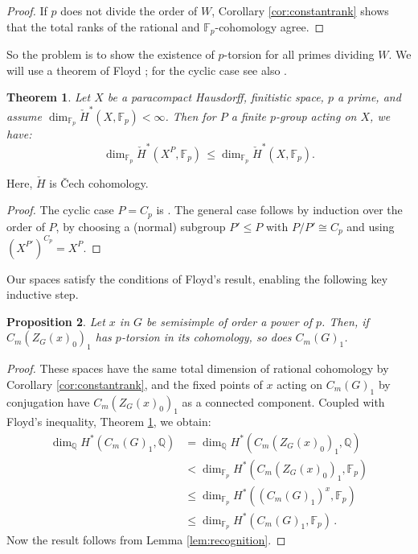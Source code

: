 \documentclass[oneside, 12pt, a4paper]{amsart}
\numberwithin{equation}{section}
\newcommand{\F}{\mathbb{F}}
\theoremstyle{plain}
\newtheorem{theorem}{Theorem}[section]
\newtheorem{proposition}[theorem]{Proposition}
\theoremstyle{definition}
\theoremstyle{remark}
\begin{document}
\begin{proof}
If $p$ does not divide the order of $W$, Corollary \ref{cor:constantrank} shows that the total ranks of the rational and $\mathbb{F}_p$-cohomology agree.
\end{proof}

So the problem is to show the existence of $p$-torsion for all primes dividing $W$. We will use a theorem of Floyd \cite[Theorem 4.4]{Floyd}; for the cyclic case see also \cite[Theorem 3.10.4]{AlldayPuppe}.
\begin{theorem}\label{thm:floyd}
Let $X$ be a paracompact Hausdorff, finitistic space, $p$ a prime, and assume $\dim_{\F_p}\check{H}^\ast(X,\F_p) < \infty$. Then for $P$ a finite $p$-group acting on $X$, we have:
\[
\dim_{\F_p} \check{H}^\ast(X^P,\F_p)\, \leq \dim_{\F_p} \check{H}^\ast(X,\F_p). 
\]
\end{theorem}

Here, $\check{H}$ is \v{C}ech cohomology.

\begin{proof}
The cyclic case $P=C_p$ is \cite[Theorem 3.10.4]{AlldayPuppe}. The general case follows by induction over the order of $P$, by choosing a (normal) subgroup $P'\leq P$ with $P/P'\cong C_p$ and using $(X^{P'})^{C_p}= X^P$.
\end{proof}

Our spaces satisfy the conditions of Floyd's result, enabling the following key inductive step.

\begin{proposition} \label{prop:smith}
Let $x$ in $G$ be semisimple of order a power of $p$. Then, if $C_m(Z_G(x)_0)_1$ has $p$-torsion in its cohomology, so does $C_m(G)_1$.
\end{proposition}
\begin{proof}
These spaces have the same total dimension of rational cohomology by Corollary \ref{cor:constantrank}, and the fixed points of $x$ acting on $C_m(G)_1$ by conjugation have $C_m(Z_G(x)_0)_1$ as a connected component. Coupled with Floyd's inequality, Theorem \ref{thm:floyd}, we obtain:
\begin{equation*}
\begin{split}
\dim_{\mathbb{Q}}H^*(C_m(G)_1,\mathbb{Q}) &= \dim_{\mathbb{Q}}H^*(C_m(Z_G(x)_0)_1,\mathbb{Q}) \\&<
\dim_{\mathbb{F}_p}H^*(C_m(Z_G(x)_0)_1,\mathbb{F}_p)\\&\leq \dim_{\mathbb{F}_p}H^*((C_m(G)_1)^x,\mathbb{F}_p)\\&\leq \dim_{\mathbb{F}_p}H^*(C_m(G)_1,\mathbb{F}_p)\, .
\end{split}
\end{equation*}
Now the result follows from Lemma \ref{lem:recognition}.
\end{proof}
\end{document}
